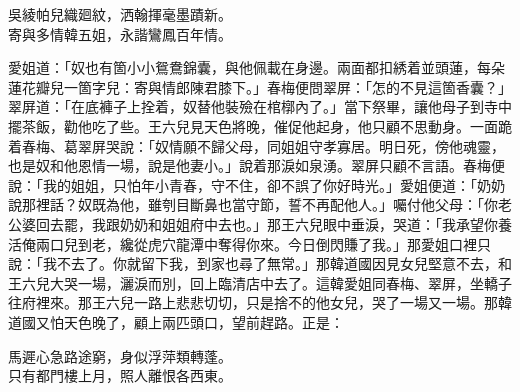 \begin{myquote}
吳綾帕兒織廻紋，洒翰揮毫墨蹟新。\\寄與多情韓五姐，永諧鸞鳳百年情。{}
\end{myquote}

愛姐道：「奴也有箇小小鴛鴦錦囊，與他佩載在身邊。兩面都扣綉着並頭蓮，每朵蓮花瓣兒一箇字兒：寄與情郎陳君膝下。」春梅便問翠屏：「怎的不見這箇香囊？」翠屏道：「在底褲子上拴着，奴替他裝殮在棺槨內了。」當下祭畢，讓他母子到寺中擺茶飯，勸他吃了些。王六兒見天色將晚，催促他起身，他只顧不思動身。一面跪着春梅、葛翠屏哭說：「奴情願不歸父母，同姐姐守孝寡居。明日死，傍他魂靈，也是奴和他恩情一場，說是他妻小。」說着那淚如泉湧。{}翠屏只顧不言語。春梅便說：「我的姐姐，只怕年小青春，守不住，卻不誤了你好時光。」愛姐便道：「奶奶說那裡話？奴既為他，雖刳目斷鼻也當守節，誓不再配他人。」囑付他父母：「你老公婆回去罷，我跟奶奶和姐姐府中去也。」那王六兒眼中垂淚，哭道：「我承望你養活俺兩口兒到老，纔從虎穴龍潭中奪得你來。今日倒閃賺了我。」那愛姐口裡只說：「我不去了。你就留下我，到家也尋了無常。」{}那韓道國因見女兒堅意不去，和王六兒大哭一場，灑淚而別，回上臨清店中去了。這韓愛姐同春梅、翠屏，坐轎子往府裡來。那王六兒一路上悲悲切切，只是捨不的他女兒，哭了一場又一場。{}那韓道國又怕天色晚了，顧上兩匹頭口，望前趕路。正是：

\begin{myquote}
馬遲心急路途窮，身似浮萍類轉蓬。\\只有都門樓上月，照人離恨各西東。
\end{myquote}

